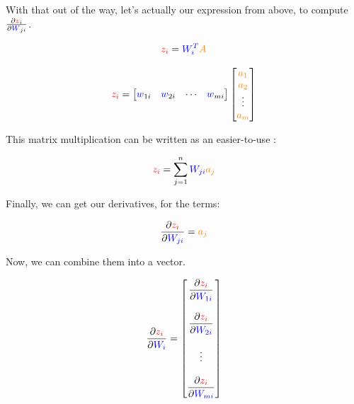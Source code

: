         \subsecdiv
        
        With that out of the way, let's actually  our expression from above, to compute $\frac{\partial  \textcolor{red}{z}_i }{\partial  \textcolor{blue}{W}_{ji} }$.

        \begin{equation}
            \textcolor{red}{z_i} = \textcolor{blue}{W_i^T}\textcolor{orange}{A}
        \end{equation}
        
        \begin{equation}
            \textcolor{red}{z_i} 
            =
            \begin{bmatrix}
                \textcolor{blue}{w}_{1i} & \textcolor{blue}{w}_{2i} & \cdots & \textcolor{blue}{w}_{mi}
            \end{bmatrix}
            \begin{bmatrix}
                \textcolor{orange}{a_1}\\\textcolor{orange}{a_2}\\ \vdots \\ \textcolor{orange}{a_m}
            \end{bmatrix}
        \end{equation}
        
        This matrix multiplication can be written as an easier-to-use :
        
        \begin{equation}
            \textcolor{red}{z_i} 
            =
            \sum_{j=1}^n
            \textcolor{blue}{W_{ji} }\textcolor{orange}{a_j}
        \end{equation}
        
        Finally, we can get our derivatives, for the  terms:
        
        \begin{equation}
            \frac{\partial  \textcolor{red}{z_i} }{\partial   \textcolor{blue}{W_{ji} }} = \textcolor{orange}{a_j}
        \end{equation}
        
        Now, we can combine them into a vector.
        
        \begin{equation}
            \frac{\partial  \textcolor{red}{z_i} }{\partial   \textcolor{blue}{W_{i} }} =
            \begin{bmatrix}
                \dfrac{\partial  \textcolor{red}{z_i} }{\partial   \textcolor{blue}{W_{1i} }}
                \\\\
                \dfrac{\partial  \textcolor{red}{z_i} }{\partial   \textcolor{blue}{W_{2i} }}
                \\\\
                \vdots
                \\\\
                \dfrac{\partial  \textcolor{red}{z_i} }{\partial   \textcolor{blue}{W_{mi} }}
            \end{bmatrix}
        \end{equation}
        

